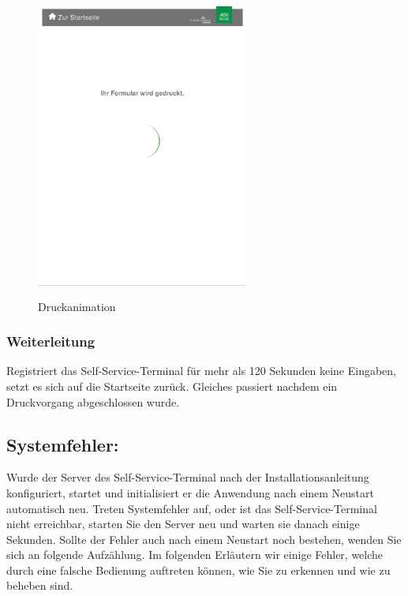 \begin{figure}[htp]
    \centering
    \includegraphics[width=7cm , height=10cm]{Bilder/Drucken.png}
    \caption[Startseite des Self-Service-Terminals]{Druckanimation}
    \label{fig:SSTDrucken}
\end{figure}

\subsubsection{Weiterleitung} Registriert das Self-Service-Terminal für mehr als 120 Sekunden keine Eingaben, setzt es sich auf die Startseite zurück. Gleiches passiert nachdem ein Druckvorgang abgeschlossen wurde.

\newpage

\subsection{Systemfehler:}
Wurde der Server des Self-Service-Terminal nach der Installationsanleitung konfiguriert, startet und initialisiert er die Anwendung nach einem Neustart automatisch neu. Treten Systemfehler auf, oder ist das Self-Service-Terminal nicht erreichbar, starten Sie den Server neu und warten sie danach einige Sekunden. Sollte der Fehler auch nach einem Neustart noch bestehen, wenden Sie sich an folgende Aufzählung.
Im folgenden Erläutern wir einige Fehler, welche durch eine falsche Bedienung auftreten können, wie Sie zu erkennen und wie zu beheben sind.

